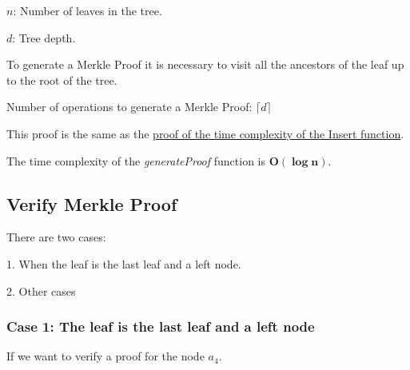 \documentclass{article}
\begin{document}
$n$: Number of leaves in the tree.

$d$: Tree depth.



To generate a Merkle Proof it is necessary to visit all the ancestors of the leaf up to the root of the tree.



Number of operations to generate a Merkle Proof: $\lceil d \rceil$

This proof is the same as the \hyperref[InsertProof]{proof of the time complexity of the Insert function}.

The time complexity of the \textit{generateProof} function is $\boldsymbol{O(\log n)}$.



\subsection{Verify Merkle Proof}

There are two cases:

1. When the leaf is the last leaf and a left node.

2. Other cases



\subsubsection*{Case 1: The leaf is the last leaf and a left node}



If we want to verify a proof for the node $a_4$.
\end{document}
